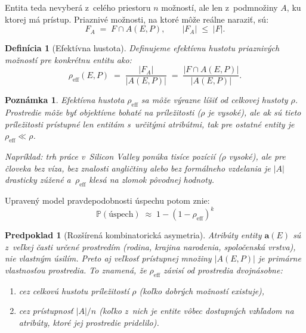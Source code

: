 \documentclass[12pt,a4paper]{article}
\newtheorem{definition}{Definícia}[section]
\newtheorem{assumption}{Predpoklad}[section]
\newtheorem{remark}{Poznámka}[section]
\begin{document}
Entita teda nevyberá z~celého priestoru $n$ možností, ale len z~podmnožiny $A$, ku ktorej má prístup. Priaznivé možnosti, na ktoré môže reálne naraziť, sú:
\begin{equation}
    F_A \;=\; F \cap A(E, P), \qquad |F_A| \;\leq\; |F|.
\end{equation}

\begin{definition}[Efektívna hustota]
Definujeme \emph{efektívnu hustotu} priaznivých možností pre konkrétnu entitu ako:
\begin{equation}
    \rho_{\text{eff}}(E, P) \;=\; \frac{|F_A|}{|A(E, P)|} \;=\; \frac{|F \cap A(E, P)|}{|A(E, P)|}.
\end{equation}
\end{definition}

\begin{remark}
Efektívna hustota $\rho_{\text{eff}}$ sa môže výrazne líšiť od celkovej hustoty $\rho$. Prostredie môže byť objektívne bohaté na príležitosti ($\rho$ je vysoké), ale ak sú tieto príležitosti prístupné len entitám s~určitými atribútmi, tak pre ostatné entity je $\rho_{\text{eff}} \ll \rho$.

Napríklad: trh práce v~Silicon Valley ponúka tisíce pozícií ($\rho$ vysoké), ale pre človeka bez víza, bez znalosti angličtiny alebo bez formálneho vzdelania je $|A|$ drasticky zúžené a~$\rho_{\text{eff}}$ klesá na zlomok pôvodnej hodnoty.
\end{remark}

Upravený model pravdepodobnosti úspechu potom znie:
\begin{equation}\label{eq:approx_eff}
    \boxed{\;\mathbb{P}(\text{úspech}) \;\approx\; 1 - (1 - \rho_{\text{eff}})^k\;}
\end{equation}

\begin{assumption}[Rozšírená kombinatorická asymetria]\label{asp:rozsirena}
Atribúty entity $\mathbf{a}(E)$ sú z~veľkej časti určené prostredím (rodina, krajina narodenia, spoločenská vrstva), nie vlastným úsilím. Preto aj veľkosť prístupnej množiny $|A(E, P)|$ je primárne vlastnosťou prostredia. To znamená, že $\rho_{\text{eff}}$ závisí od prostredia dvojnásobne:
\begin{enumerate}
    \item cez celkovú hustotu príležitostí $\rho$ (koľko dobrých možností existuje),
    \item cez prístupnosť $|A|/n$ (koľko z~nich je entite vôbec dostupných vzhľadom na atribúty, ktoré jej prostredie pridelilo).
\end{enumerate}
\end{assumption}
\end{document}
